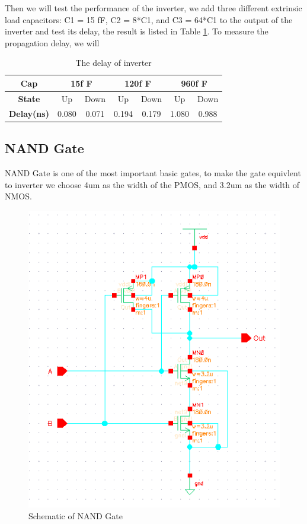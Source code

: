 \documentclass[conference]{IEEEtran}
\begin{document}
Then we will test the performance of the inverter, we add three different extrinsic load capacitors: C1 = 15 fF, C2 = 8*C1, and C3 = 64*C1 to the output of the inverter and test its delay, the result is listed in Table \ref{The delay of inverter}. To measure the propagation delay, we will 

\begin{table}[h]
    \caption{The delay of inverter}
    \begin{center}
        \begin{tabular}{|c|c|c|c|c|c|c|}
            \hline
            \textbf{Cap} & \multicolumn{2}{|c|}{15f F} & \multicolumn{2}{|c|}{120f F} & \multicolumn{2}{|c|}{960f F} \\
            \hline
            \textbf{State} & Up & Down & Up & Down & Up & Down \\
            \hline
            \textbf{Delay(ns)} & 0.080 & 0.071 & 0.194 & 0.179 & 1.080 & 0.988 \\
            \hline
        \end{tabular}
    \end{center}
    \label{The delay of inverter}
\end{table}

\subsection{NAND Gate}

NAND Gate is one of the most important basic gates, to make the gate equivlent to inverter we choose 4um as the width of the PMOS, and 3.2um as the width of NMOS.

\begin{figure}[H]
    \centering
    \includegraphics[width = 0.7\linewidth]{nand2_schematic.png}
    \caption{Schematic of NAND Gate}
    \label{Schematic of NAND Gate}
\end{figure}
\end{document}
